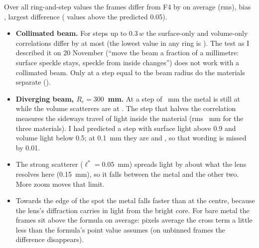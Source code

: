 \documentclass[11pt]{article}
\begin{document}
\noindent Over all \beamCount{} ring-and-step values the frames differ from F4 by \beamRms{} on average (rms), bias
\beamBias, largest difference \beamWorst{} (\beamOver{} values above the predicted 0.05).
\begin{itemize}
\item \textbf{Collimated beam.} For steps up to $0.3\,w$ the surface-only and volume-only correlations differ by at
  most \beamFlatGap{} (the lowest value in any ring is \beamFlatMin). The test as I described it on 20 November (``move the beam a fraction of a millimetre: surface
  speckle stays, speckle from inside changes'') does not work with a collimated beam. Only at a step equal to the
  beam radius do the materials separate (\beamFlatAtW).
\item \textbf{Diverging beam, $R_c=300$~mm.} At a step of \beamBestStep~mm the metal is still at \beamBestMetal{}
  while the volume scatterers are at \beamBestVol. The step that halves the correlation measures the sideways travel
  of light inside the material (rms \beamSpread~mm for the three materials). I had predicted a step with surface
  light above 0.9 and volume light below 0.5; at 0.1~mm they are \beamTenthMetal{} and \beamTenthVol, so that wording is
  missed by 0.01.
\item The strong scatterer ($\ell^*=0.05$~mm) spreads light by about what the lens resolves here (0.15~mm), so it
  falls between the metal and the other two. More zoom moves that limit.
\item Towards the edge of the spot the metal falls faster than at the centre, because the lens's diffraction carries
  in light from the bright core. For bare metal the frames sit \beamMetalBias{} above the formula on average: pixels
  average the cross term a little less than the formula's point value assumes (on unbinned frames the difference
  disappears).
\end{itemize}
\end{document}
